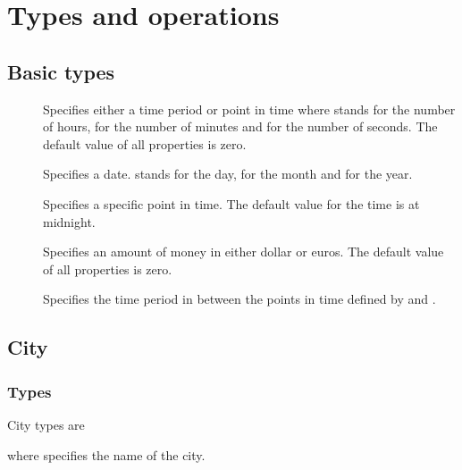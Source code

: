 \section{Types and operations}
\label{sec:operations}

\subsection{Basic types}
\begin{description}
  \item[] 

    Specifies either a time period or point in time where  stands for the
    number of hours,  for the number of minutes and  for the
    number of seconds. The default value of all properties is zero.
  \item[] 

    Specifies a date.  stands for the day,  for the month and
     for the year.
  \item[] 

    Specifies a specific point in time. The default value for the time is at
    midnight.
  \item[] 

    Specifies an amount of money in either dollar or euros. The default value of
    all properties is zero.
  \item[] 

    Specifies the time period in between the points in time defined by
     and .
\end{description}

\subsection{City}
\subsubsection{Types}
City types are
\begin{description}
  \item[] 
  \item[] 
\end{description}
where  specifies the name of the city. 


